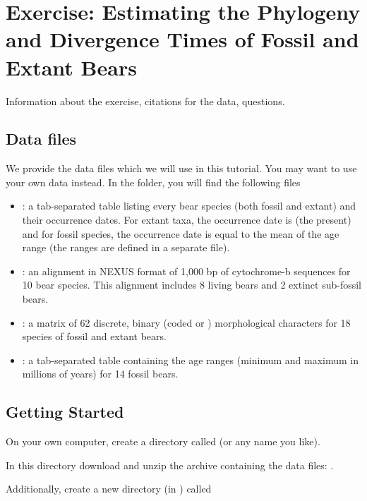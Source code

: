 \section{Exercise: Estimating the Phylogeny and Divergence Times of Fossil and Extant Bears}\label{sect:RB-ExerciseMain}

Information about the exercise, citations for the data, questions. 

\subsection{Data files}\label{subsect:RB-DataFiles}

We provide the data files which we will use in this tutorial.
You may want to use your own data instead.
In the  folder, you will find the following files
\begin{itemize}[noitemsep,topsep=0pt]
\item {}: a tab-separated table listing every bear species (both fossil and extant) and their occurrence dates. For extant taxa, the occurrence date is  (\IE the present) and for fossil species, the occurrence date is equal to the mean of the age range (the ranges are defined in a separate file).
\item {}: an alignment in NEXUS format of 1,000 bp of cytochrome-b sequences for 10 bear species. This alignment includes 8 living bears and 2 extinct sub-fossil bears.
\item {}: a matrix of 62 discrete, binary (coded  or ) morphological characters for 18 species of fossil and extant bears.
\item {}: a tab-separated table containing the age ranges (minimum and maximum in millions of years) for 14 fossil bears.
\end{itemize}


\bigskip
\subsection{Getting Started}\label{subsect:RB-GetStart}

{\begin{framed}
On your own computer, create a directory called {\textcolor{red}{}} (or any name you like). 

In this directory download and unzip the archive containing the data files: \href{www.revbayes.com}{}.

Additionally, create a new directory (in ) called {\textcolor{red}{}}
\end{framed}}

